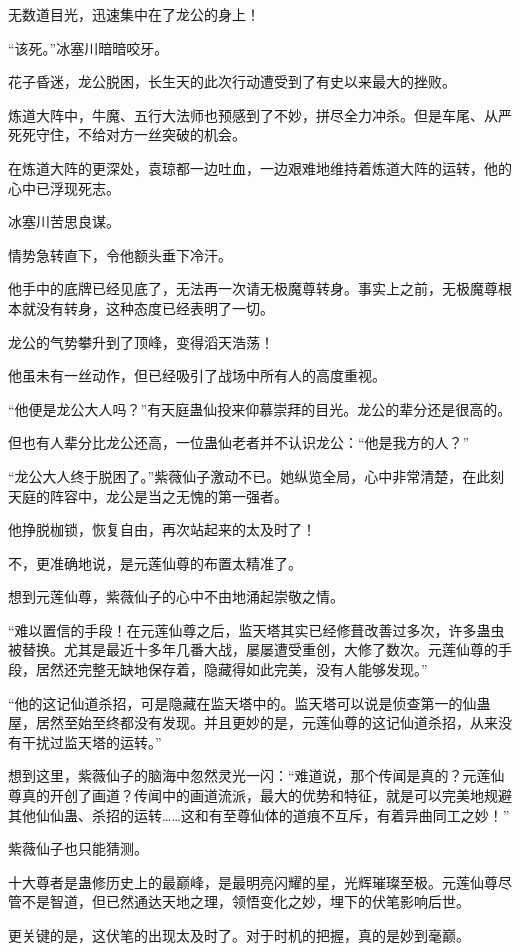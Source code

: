 \begin{this_body}
无数道目光，迅速集中在了龙公的身上！

“该死。”冰塞川暗暗咬牙。

花子昏迷，龙公脱困，长生天的此次行动遭受到了有史以来最大的挫败。

炼道大阵中，牛魔、五行大法师也预感到了不妙，拼尽全力冲杀。但是车尾、从严死死守住，不给对方一丝突破的机会。

在炼道大阵的更深处，袁琼都一边吐血，一边艰难地维持着炼道大阵的运转，他的心中已浮现死志。

冰塞川苦思良谋。

情势急转直下，令他额头垂下冷汗。

他手中的底牌已经见底了，无法再一次请无极魔尊转身。事实上之前，无极魔尊根本就没有转身，这种态度已经表明了一切。

龙公的气势攀升到了顶峰，变得滔天浩荡！

他虽未有一丝动作，但已经吸引了战场中所有人的高度重视。

“他便是龙公大人吗？”有天庭蛊仙投来仰慕崇拜的目光。龙公的辈分还是很高的。

但也有人辈分比龙公还高，一位蛊仙老者并不认识龙公：“他是我方的人？”

“龙公大人终于脱困了。”紫薇仙子激动不已。她纵览全局，心中非常清楚，在此刻天庭的阵容中，龙公是当之无愧的第一强者。

他挣脱枷锁，恢复自由，再次站起来的太及时了！

不，更准确地说，是元莲仙尊的布置太精准了。

想到元莲仙尊，紫薇仙子的心中不由地涌起崇敬之情。

“难以置信的手段！在元莲仙尊之后，监天塔其实已经修葺改善过多次，许多蛊虫被替换。尤其是最近十多年几番大战，屡屡遭受重创，大修了数次。元莲仙尊的手段，居然还完整无缺地保存着，隐藏得如此完美，没有人能够发现。”

“他的这记仙道杀招，可是隐藏在监天塔中的。监天塔可以说是侦查第一的仙蛊屋，居然至始至终都没有发现。并且更妙的是，元莲仙尊的这记仙道杀招，从来没有干扰过监天塔的运转。”

想到这里，紫薇仙子的脑海中忽然灵光一闪：“难道说，那个传闻是真的？元莲仙尊真的开创了画道？传闻中的画道流派，最大的优势和特征，就是可以完美地规避其他仙仙蛊、杀招的运转……这和有至尊仙体的道痕不互斥，有着异曲同工之妙！”

紫薇仙子也只能猜测。

十大尊者是蛊修历史上的最巅峰，是最明亮闪耀的星，光辉璀璨至极。元莲仙尊尽管不是智道，但已然通达天地之理，领悟变化之妙，埋下的伏笔影响后世。

更关键的是，这伏笔的出现太及时了。对于时机的把握，真的是妙到毫巅。


\end{this_body}
